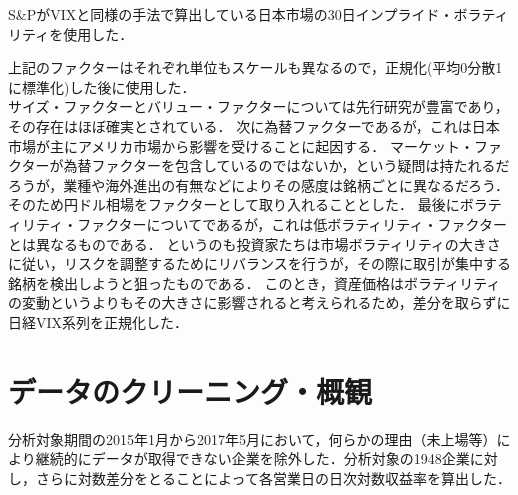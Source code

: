 ﻿\documentclass[11pt]{jreport}
\begin{document}
\begin{itemize}
\begin{itemize}
S\&PがVIXと同様の手法で算出している日本市場の30日インプライド・ボラティリティを使用した．
\end{itemize}
上記のファクターはそれぞれ単位もスケールも異なるので，正規化(平均0分散1に標準化)した後に使用した．\\
\quad 
サイズ・ファクターとバリュー・ファクターについては先行研究が豊富であり，その存在はほぼ確実とされている．
次に為替ファクターであるが，これは日本市場が主にアメリカ市場から影響を受けることに起因する．
マーケット・ファクターが為替ファクターを包含しているのではないか，という疑問は持たれるだろうが，業種や海外進出の有無などによりその感度は銘柄ごとに異なるだろう．
そのため円ドル相場をファクターとして取り入れることとした．
最後にボラティリティ・ファクターについてであるが，これは低ボラティリティ・ファクターとは異なるものである．
というのも投資家たちは市場ボラティリティの大きさに従い，リスクを調整するためにリバランスを行うが，その際に取引が集中する銘柄を検出しようと狙ったものである．
このとき，資産価格はボラティリティの変動というよりもその大きさに影響されると考えられるため，差分を取らずに日経VIX系列を正規化した．\\

\end{itemize}



\section{データのクリーニング・概観}
分析対象期間の2015年1月から2017年5月において，何らかの理由（未上場等）により継続的にデータが取得できない企業を除外した．分析対象の1948企業に対し，さらに対数差分をとることによって各営業日の日次対数収益率を算出した．
\end{document}
